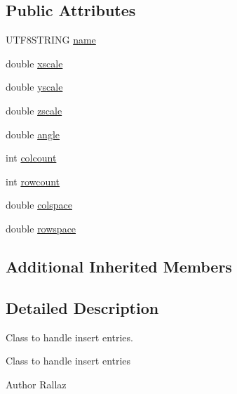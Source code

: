\subsection*{Public Attributes}
\begin{DoxyCompactItemize}
\item 
U\-T\-F8\-S\-T\-R\-I\-N\-G \hyperlink{classDRW__Insert_aac767b55f89a1ba2f95a01573dde4302}{name}
\item 
double \hyperlink{classDRW__Insert_a7b9b914c2570967914074f374ddbe9ef}{xscale}
\item 
double \hyperlink{classDRW__Insert_a412f380485be38075b05976337102a47}{yscale}
\item 
double \hyperlink{classDRW__Insert_a0f1cd0ef6b837894679b1135ce4bb132}{zscale}
\item 
double \hyperlink{classDRW__Insert_ad685a40847d4a5a8458ecaff2ccc4f3d}{angle}
\item 
int \hyperlink{classDRW__Insert_acd0f0491349b2159c6009634f883c3e7}{colcount}
\item 
int \hyperlink{classDRW__Insert_ac9bc5494805108fd83f5e1851d12b90b}{rowcount}
\item 
double \hyperlink{classDRW__Insert_a4fe4d62a16d3288286004aa8dd49acb6}{colspace}
\item 
double \hyperlink{classDRW__Insert_af9dde2e71b5fc348b0018c0e5c74d9cf}{rowspace}
\end{DoxyCompactItemize}
\subsection*{Additional Inherited Members}


\subsection{Detailed Description}
Class to handle insert entries. 

Class to handle insert entries \begin{DoxyAuthor}{Author}
Rallaz 
\end{DoxyAuthor}


